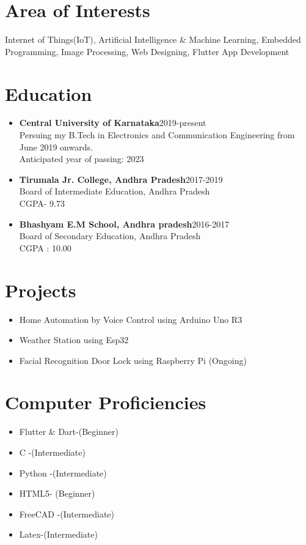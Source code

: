 \documentclass[]{article}
\begin{document}
    \section*{Area of Interests}
    Internet of Things(IoT), Artificial Intelligence \& Machine Learning, Embedded Programming, Image Processing, Web Designing, Flutter App Development
    \section*{Education} %
    \begin{itemize}
        \item \textbf{Central University of Karnataka}\hspace{7.1cm}2019-present\\Persuing my B.Tech in Electronics and Communication Engineering from June 2019 onwards.\\Anticipated year of passing: 2023
        \item \textbf{Tirumala Jr. College, Andhra Pradesh}\hspace{6cm}2017-2019\\Board of Intermediate Education, Andhra Pradesh\\CGPA- 9.73
        \item \textbf{Bhashyam E.M School, Andhra pradesh}\hspace{5.8cm}2016-2017\\Board of Secondary Education, Andhra Pradesh\\CGPA : 10.00
    \end{itemize} %
    \section*{Projects}
    \begin{itemize}
        \item Home Automation by Voice Control using Arduino Uno R3
        \item Weather Station using Esp32
        \item Facial Recognition Door Lock using Raspberry Pi (Ongoing)
    \end{itemize}
    \section*{Computer Proficiencies}
    \begin{multicols}{2}[]
    \begin{itemize}
	\item Flutter \& Dart-(Beginner)
        \item C -(Intermediate)
        \item Python -(Intermediate)
        \item HTML5- (Beginner)
        \item FreeCAD -(Intermediate)
        \item Latex-(Intermediate)
    \end{itemize}
    \end{multicols}
\end{document}
